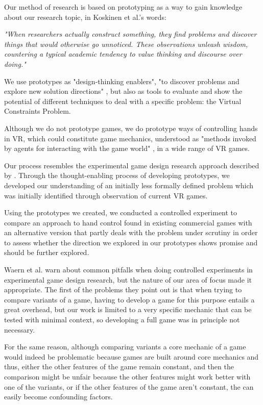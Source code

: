 Our method of research is based on prototyping as a way to gain knowledge about our research topic, in Koskinen et al.'s words:

\begin{displayquote}
\textit{"When researchers actually construct something, they find problems and discover things that would otherwise go unnoticed. These observations unleash wisdom, countering a typical academic tendency to value thinking and discourse over doing."} \parencite{Koskinen2011}
\end{displayquote}

We use prototypes as "design-thinking enablers", "to discover problems and explore new solution directions" \parencite{Lim2008}, but also as tools to evaluate and show the potential of different techniques to deal with a specific problem: the Virtual Constraints Problem.

Although we do not prototype games, we do prototype ways of controlling hands in VR, which could constitute game mechanics, understood as "methods invoked by agents for interacting with the game world" \parencite{Sicart2008}, in a wide range of VR games.

Our process resembles the experimental game design research approach described by \parencite{Waern2015}. Through the thought-enabling process of developing prototypes, we developed our understanding of an initially less formally defined problem which was initially identified through observation of current VR games.

Using the prototypes we created, we conducted a controlled experiment \parencite{Waern2015} to compare an approach to hand control found in existing commercial games with an alternative version that partly deals with the problem under scrutiny in order to assess whether the direction we explored in our prototypes shows promise and should be further explored.

Waern et al. warn about common pitfalls when doing controlled experiments in experimental game design research, but the nature of our area of focus made it appropriate. The first of the problems they point out is that when trying to compare variants of a game, having to develop a game for this purpose entails a great overhead, but our work is limited to a very specific mechanic that can be tested with minimal context, so developing a full game was in principle not necessary.

For the same reason, although comparing variants a core mechanic of a game would indeed be problematic because games are built around core mechanics and thus, either the other features of the game remain constant, and then the comparison might be unfair because the other features might work better with one of the variants, or if the other features of the game aren't constant, the can easily become confounding factors.

